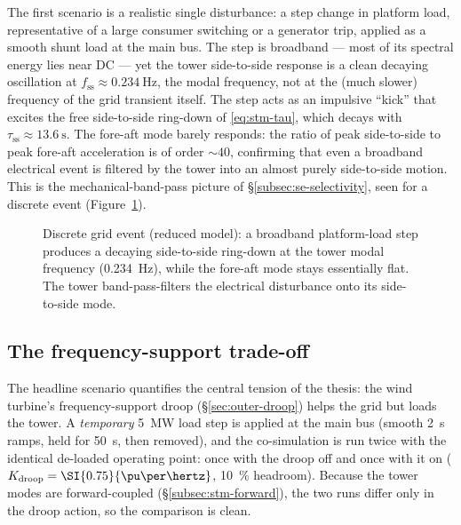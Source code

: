The first scenario is a realistic single disturbance: a step change in platform
load, representative of a large consumer switching or a generator trip, applied
as a smooth shunt load at the main bus. The step is broadband --- most of its
spectral energy lies near DC --- yet the tower side-to-side response is a clean
decaying oscillation at \(f_{\mathrm{ss}}\approx\SI{0.234}{\hertz}\), the modal
frequency, not at the (much slower) frequency of the grid transient itself. The
step acts as an impulsive ``kick'' that excites the free side-to-side ring-down
of \eqref{eq:stm-tau}, which decays with \(\tau_{\mathrm{ss}}\approx
\SI{13.6}{\second}\). The fore-aft mode barely responds: the ratio of peak
side-to-side to peak fore-aft acceleration is of order \(\sim\!40\), confirming
that even a broadband electrical event is filtered by the tower into an almost
purely side-to-side motion. This is the mechanical-band-pass picture of
\S\ref{subsec:se-selectivity}, seen for a discrete event
(Figure~\ref{fig:nt-gttrip}).

\begin{figure}[t]
  \centering
  \caption{Discrete grid event (reduced model): a broadband platform-load step
  produces a decaying side-to-side ring-down at the tower modal frequency
  (\SI{0.234}{\hertz}), while the fore-aft mode stays essentially flat. The tower
  band-pass-filters the electrical disturbance onto its side-to-side mode.}
  \label{fig:nt-gttrip}
\end{figure}

\subsection{The frequency-support trade-off}
\label{subsec:nt-tradeoff}

The headline scenario quantifies the central tension of the thesis: the wind
turbine's frequency-support droop (\S\ref{sec:outer-droop}) helps the grid but
loads the tower. A \emph{temporary} \SI{5}{\mega\watt} load step is applied at
the main bus (smooth \SI{2}{\second} ramps, held for \SI{50}{\second}, then
removed), and the co-simulation is run twice with the identical de-loaded
operating point: once with the droop off and once with it on
(\(K_{\mathrm{droop}}=\SI{0.75}{\pu\per\hertz}\), \SI{10}{\percent} headroom).
Because the tower modes are forward-coupled (\S\ref{subsec:stm-forward}), the two
runs differ only in the droop action, so the comparison is clean.

